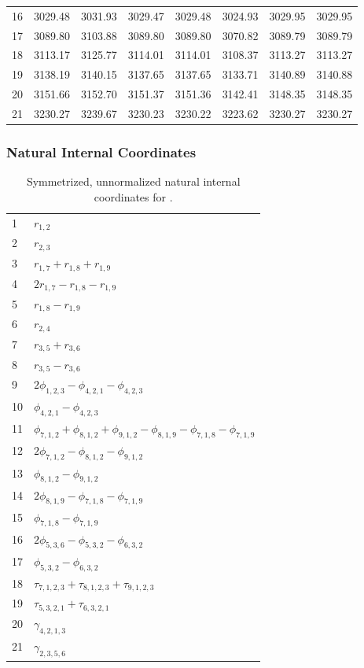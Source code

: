 \documentclass[10pt,oneside]{article}
\begin{document}
\begin{table}[h!]
\begin{tabular}{cccccccc}
16 &   3029.48 & 3031.93 & 3029.47 & 3029.48 &      3024.93 & 3029.95 & 3029.95 \\
17 &   3089.80 & 3103.88 & 3089.80 & 3089.80 &      3070.82 & 3089.79 & 3089.79 \\
18 &   3113.17 & 3125.77 & 3114.01 & 3114.01 &      3108.37 & 3113.27 & 3113.27 \\
19 &   3138.19 & 3140.15 & 3137.65 & 3137.65 &      3133.71 & 3140.89 & 3140.88 \\
20 &   3151.66 & 3152.70 & 3151.37 & 3151.36 &      3142.41 & 3148.35 & 3148.35 \\
21 &   3230.27 & 3239.67 & 3230.23 & 3230.22 &      3223.62 & 3230.27 & 3230.27 \\
\bottomrule
\end{tabular}
\end{table}

\clearpage

\subsubsection*{Natural Internal Coordinates}
\begin{table}[h!]
\centering
\caption{Symmetrized, unnormalized natural internal coordinates for .}
\small
\begin{tabular}{ll}
  1   & $r_{1,2}$ \\
  2   & $r_{2,3}$ \\
  3   & $r_{1,7} + r_{1,8} + r_{1,9}$ \\
  4   & $2r_{1,7} - r_{1,8} - r_{1,9}$ \\
  5   & $r_{1,8} - r_{1,9}$ \\
  6   & $r_{2,4}$ \\
  7   & $r_{3,5} + r_{3,6}$ \\
  8   & $r_{3,5} - r_{3,6}$ \\
  9   & $2\phi_{1,2,3} - \phi_{4,2,1} - \phi_{4,2,3}$ \\
  10  & $\phi_{4,2,1} - \phi_{4,2,3}$ \\
  11  & $\phi_{7,1,2} + \phi_{8,1,2} + \phi_{9,1,2} - \phi_{8,1,9} - \phi_{7,1,8} - \phi_{7,1,9}$ \\
  12  & $2\phi_{7,1,2} - \phi_{8,1,2} - \phi_{9,1,2}$ \\
  13  & $\phi_{8,1,2} - \phi_{9,1,2}$ \\
  14  & $2\phi_{8,1,9} - \phi_{7,1,8} - \phi_{7,1,9}$ \\
  15  & $\phi_{7,1,8} - \phi_{7,1,9}$ \\
  16  & $2\phi_{5,3,6} - \phi_{5,3,2} - \phi_{6,3,2}$ \\
  17  & $\phi_{5,3,2} - \phi_{6,3,2}$ \\
  18  & $\tau_{7,1,2,3} + \tau_{8,1,2,3} + \tau_{9,1,2,3}$ \\
  19  & $\tau_{5,3,2,1} + \tau_{6,3,2,1}$ \\
  20  & $\gamma_{4,2,1,3}$ \\
  21  & $\gamma_{2,3,5,6}$ \\
\end{tabular}
\end{table}
\end{document}
